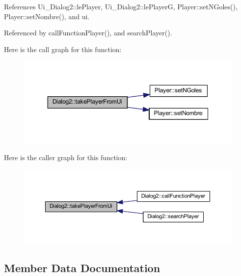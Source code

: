 References Ui\+\_\+\+Dialog2\+::le\+Player, Ui\+\_\+\+Dialog2\+::le\+Player\+G, Player\+::set\+N\+Goles(), Player\+::set\+Nombre(), and ui.



Referenced by call\+Function\+Player(), and search\+Player().



Here is the call graph for this function\+:\nopagebreak
\begin{figure}[H]
\begin{center}
\leavevmode
\includegraphics[width=348pt]{d8/dad/class_dialog2_a7d1f42eb6a8798be34da38e4df4929f7_cgraph}
\end{center}
\end{figure}




Here is the caller graph for this function\+:\nopagebreak
\begin{figure}[H]
\begin{center}
\leavevmode
\includegraphics[width=350pt]{d8/dad/class_dialog2_a7d1f42eb6a8798be34da38e4df4929f7_icgraph}
\end{center}
\end{figure}




\subsection{Member Data Documentation}
\hypertarget{class_dialog2_a30d760908a70fc65c73499b96c177d46}{}
